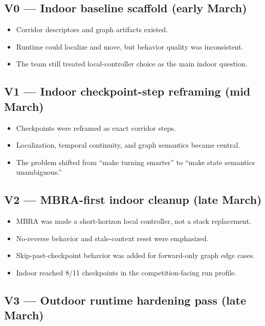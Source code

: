 \documentclass[11pt]{article}
\begin{document}
\subsection*{V0 — Indoor baseline scaffold (early March)}

\begin{itemize}[nosep]
  \item Corridor descriptors and graph artifacts existed.
  \item Runtime could localize and move, but behavior quality was inconsistent.
  \item The team still treated local-controller choice as the main indoor question.
\end{itemize}

\subsection*{V1 — Indoor checkpoint-step reframing (mid March)}

\begin{itemize}[nosep]
  \item Checkpoints were reframed as exact corridor steps.
  \item Localization, temporal continuity, and graph semantics became central.
  \item The problem shifted from ``make turning smarter'' to ``make state semantics
  unambiguous.''
\end{itemize}

\subsection*{V2 — MBRA-first indoor cleanup (late March)}

\begin{itemize}[nosep]
  \item MBRA was made a short-horizon local controller, not a stack replacement.
  \item No-reverse behavior and stale-context reset were emphasized.
  \item Skip-past-checkpoint behavior was added for forward-only graph edge cases.
  \item Indoor reached 8/11 checkpoints in the competition-facing run profile.
\end{itemize}

\subsection*{V3 — Outdoor runtime hardening pass (late March)}
\end{document}

